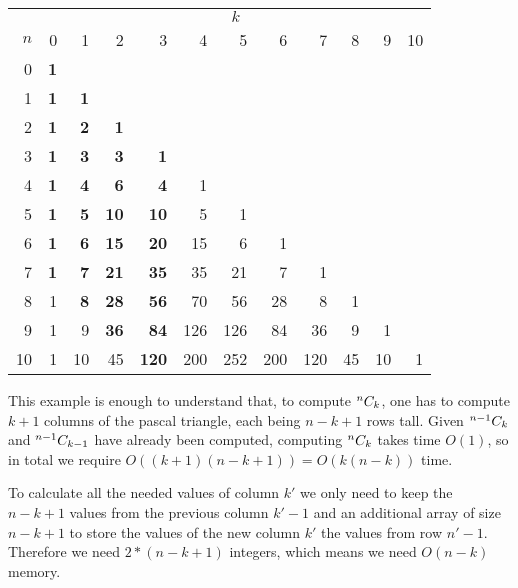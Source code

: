 {\begin{center} \begin{tabular}{r | r r r r r r r r r r r}
        & \multicolumn{11}{c}{$k$} \\
    $n$ &         0  &          1  &          2  &           3  &   4 &   5 &   6 &   7 &   8 &   9 &   10 \\ \hline
      0 & \textbf{1} &             &             &              &     &     &     &     &     &     &      \\
      1 & \textbf{1} &  \textbf{1} &             &              &     &     &     &     &     &     &      \\
      2 & \textbf{1} &  \textbf{2} & \textbf{ 1} &              &     &     &     &     &     &     &      \\
      3 & \textbf{1} &  \textbf{3} & \textbf{ 3} & \textbf{  1} &     &     &     &     &     &     &      \\
      4 & \textbf{1} &  \textbf{4} & \textbf{ 6} & \textbf{  4} &   1 &     &     &     &     &     &      \\
      5 & \textbf{1} &  \textbf{5} & \textbf{10} & \textbf{ 10} &   5 &   1 &     &     &     &     &      \\
      6 & \textbf{1} &  \textbf{6} & \textbf{15} & \textbf{ 20} &  15 &   6 &   1 &     &     &     &      \\
      7 & \textbf{1} &  \textbf{7} & \textbf{21} & \textbf{ 35} &  35 &  21 &   7 &   1 &     &     &      \\
      8 &         1  &  \textbf{8} & \textbf{28} & \textbf{ 56} &  70 &  56 &  28 &   8 &   1 &     &      \\
      9 &         1  &          9  & \textbf{36} & \textbf{ 84} & 126 & 126 &  84 &  36 &   9 &   1 &      \\
     10 &         1  &         10  &         45  & \textbf{120} & 200 & 252 & 200 & 120 &  45 &  10 &   1  \\
\end{tabular} \end{center}

This example is enough to understand that, to compute $^{n}C_{k}$, one has to compute $k+1$ columns of the pascal triangle, each being $n-k+1$ rows tall. Given $^{n-1}C_{k}$ and $^{n-1}C_{k-1}$ have already been computed, computing $^{n}C_{k}$ takes time $O(1)$, so in total we require $O((k+1)(n-k+1)) = O(k(n-k))$ time.

To calculate all the needed values of column $k'$ we only need to keep the $n-k+1$ values from the previous column $k'-1$ and an additional array of size $n-k+1$ to store the values of the new column $k'$ the values from row $n'-1$. Therefore we need $2*(n-k+1)$ integers, which means we need $O(n-k)$ memory.

}
